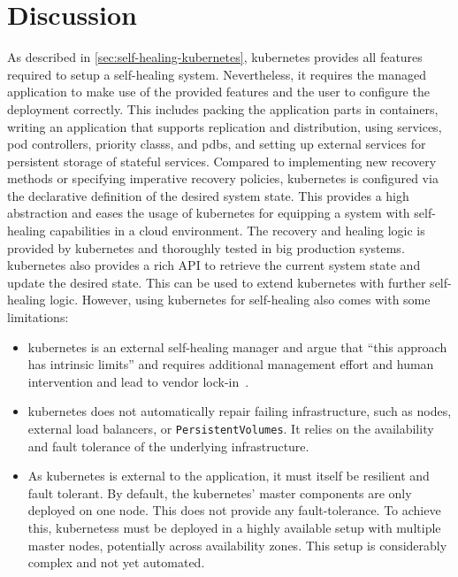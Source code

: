 
\section{Discussion}\label{sec:discussion}
  As described in \cref{sec:self-healing-kubernetes}, \gls{kubernetes} provides all features required to setup a self-healing system.
  Nevertheless, it requires the managed application to make use of the provided features and the user to configure the deployment correctly.
  This includes packing the application parts in containers, writing an application that supports replication and distribution, using \glspl{service}, \glspl{pod controller}, \glspl{priority class}, and \glspl{pdb}, and setting up external services for persistent storage of stateful services.
  Compared to implementing new recovery methods or specifying imperative recovery policies, \gls{kubernetes} is configured via the declarative definition of the desired system state.
  This provides a high abstraction and eases the usage of \gls{kubernetes} for equipping a system with self-healing capabilities in a cloud environment.
  The recovery and healing logic is provided by \gls{kubernetes} and thoroughly tested in big production systems.
  \Gls{kubernetes} also provides a rich API to retrieve the current system state and update the desired state.
  This can be used to extend \gls{kubernetes} with further self-healing logic.
  However, using \gls{kubernetes} for self-healing also comes with some limitations:
  \begin{itemize}
    \item \Gls{kubernetes} is an external self-healing manager and \citeauthor{ToffettiMicroservices} argue that \enquote{this approach has intrinsic limits} and requires additional management effort and human intervention and lead to vendor lock-in~\cite{ToffettiMicroservices}.
    \item \Gls{kubernetes} does not automatically repair failing infrastructure, such as nodes, external load balancers, or \texttt{PersistentVolumes}.
      It relies on the availability and fault tolerance of the underlying infrastructure.
    \item As \gls{kubernetes} is external to the application, it must itself be resilient and fault tolerant.
      By default, the \gls{kubernetes}' master components are only deployed on one node.
      This does not provide any fault-tolerance.
      To achieve this, \glspl{kubernetes} must be deployed in a highly available setup with multiple master nodes, potentially across availability zones.
      This setup is considerably complex and not yet automated.
  \end{itemize}
